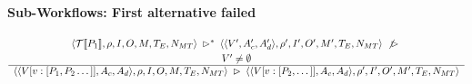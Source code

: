 \documentclass{llncs}
\newcommand{\sem}[1]{[ \! [ #1 ] \! ]}
\newcommand{\tuple}[1]{\langle #1 \rangle}
\newcommand{\trad}[1]{{\cal T}\sem{ #1 }}
\def\tr{\rhd}    %
\newcommand{\pfrule}[2]{\begin{array}{c} #1 \\ \hline #2 \end{array}}
\begin{document}
\paragraph{Sub-Workflows: First alternative failed}
$$
\pfrule{
\tuple{\trad{P_1},\rho, I, O, M, T_E, N_{MT}}
\; \tr^* \;
\tuple{\tuple{V', A'_c, A'_d},\rho', I', O', M', T_E, N_{MT}}
\; \not\tr \;\\[1mm]
V' \neq \emptyset
}{
\tuple{\tuple{V[v:[P_1,P_2\dots]], A_c, A_d},\rho, I, O, M, T_E, N_{MT}}
\; \tr \;
\tuple{\tuple{V[v:[P_2,\dots]], A_c, A_d},\rho', I', O', M', T_E, N_{MT}}
}
$$
\end{document}

